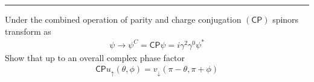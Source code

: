 \noindent\rule{7in}{1.5pt}


\begin{problem}{4.14}
Under the combined operation of parity and charge conjugation $(\mathsf{CP})$ spinors transform as
\begin{align*}
    \psi \to \psi^C = \mathsf{CP} \psi = i \gamma^2\gamma^0 \psi^\ast 
\end{align*}
Show that up to an overall complex phase factor
\begin{align*}
    \mathsf{CP} u_\uparrow \left( \theta,\phi \right) = v_\downarrow  \left( \pi-\theta,\pi+\phi \right)
\end{align*}
\end{problem}
